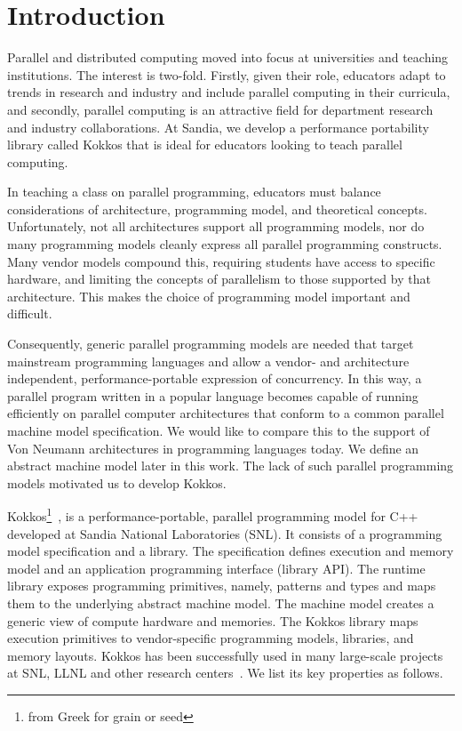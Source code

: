 
\section{Introduction}\label{chap:introduction}

Parallel and distributed computing moved into focus at universities and teaching institutions. The interest is two-fold. Firstly, given their role, educators adapt to trends in research and industry and include parallel computing in their curricula, and secondly, parallel computing is an attractive field for department research and industry collaborations. At Sandia, we develop a performance portability library called Kokkos that is ideal for educators looking to teach parallel computing.

In teaching a class on parallel programming, educators must balance considerations of architecture, programming model, and theoretical concepts. Unfortunately, not all architectures support all programming models, nor do many programming models cleanly express all parallel programming constructs. Many vendor models compound this, requiring students have access to specific hardware, and limiting the concepts of parallelism to those supported by that architecture. This makes the choice of programming model important and difficult.

Consequently, generic parallel programming models are needed that target mainstream programming languages and allow a vendor- and architecture independent, performance-portable expression of concurrency. In this way, a parallel program written in a popular language becomes capable of running efficiently on parallel computer architectures that conform to a common parallel machine model specification. We would like to compare this to the support of Von Neumann architectures in programming languages today. We define an abstract machine model later in this work. The lack of such parallel programming models motivated us to develop Kokkos.

Kokkos\footnote{from Greek for grain or seed}~\cite{KOKKOS_PAPER_HERE}, is a performance-portable, parallel programming model for C++ developed at Sandia National Laboratories (SNL). It consists of a programming model specification and a library. The specification defines execution and memory model and an application programming interface (library API). The runtime library exposes programming primitives, namely, patterns and types and maps them to the underlying abstract machine model. The machine model creates a generic view of compute hardware and memories. The Kokkos library maps execution primitives to vendor-specific programming models, libraries, and memory layouts. Kokkos has been successfully used in many large-scale projects at SNL, LLNL and other research centers~\cite{CITEKOKKOSUSECASES}. We list its key properties as follows.

